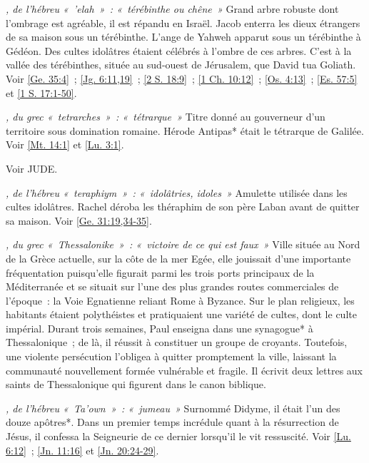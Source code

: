 \begin{multicols}{2}
\textit{, de l'hébreu «~'elah~»~: «~térébinthe ou chêne~»}\newline
Grand arbre robuste dont l'ombrage est agréable, il est répandu en Israël. Jacob enterra les dieux étrangers de sa maison sous un térébinthe. L'ange de Yahweh apparut sous un térébinthe à Gédéon. Des cultes idolâtres étaient célébrés à l'ombre de ces arbres. C'est à la vallée des térébinthes, située au sud-ouest de Jérusalem, que David tua Goliath. Voir \vref{Ge. 35:4}~; \vref{Jg. 6:11,19}~; \vref{2 S. 18:9}~; \vref{1 Ch. 10:12}~; \vref{Os. 4:13}~; \vref{Es. 57:5} et \vref{1 S. 17:1-50}.

\textit{, du grec «~tetrarches~»~: «~tétrarque~»}\newline
Titre donné au gouverneur d'un territoire sous domination romaine. Hérode Antipas* était le tétrarque de Galilée. Voir \vref{Mt. 14:1} et \vref{Lu. 3:1}.

\textit{}\newline
Voir JUDE.

\textit{, de l'hébreu «~teraphiym~»~: «~idolâtries, idoles~»}\newline
Amulette utilisée dans les cultes idolâtres. Rachel déroba les théraphim de son père Laban avant de quitter sa maison. Voir \vref{Ge. 31:19,34-35}.

\textit{, du grec «~Thessalonike~»~: «~victoire de ce qui est faux~»}\newline
Ville située au Nord de la Grèce actuelle, sur la côte de la mer Egée, elle jouissait d'une importante fréquentation puisqu'elle figurait parmi les trois ports principaux de la Méditerranée et se situait sur l'une des plus grandes routes commerciales de l'époque~: la Voie Egnatienne reliant Rome à Byzance. Sur le plan religieux, les habitants étaient polythéistes et pratiquaient une variété de cultes, dont le culte impérial. Durant trois semaines, Paul enseigna dans une synagogue* à Thessalonique~; de là, il réussit à constituer un groupe de croyants. Toutefois, une violente persécution l'obligea à quitter promptement la ville, laissant la communauté nouvellement formée vulnérable et fragile. Il écrivit deux lettres aux saints de Thessalonique qui figurent dans le canon biblique.

\textit{, de l'hébreu «~Ta'own~»~: «~jumeau~»}\newline
Surnommé Didyme, il était l'un des douze apôtres*. Dans un premier temps incrédule quant à la résurrection de Jésus, il confessa la Seigneurie de ce dernier lorsqu'il le vit ressuscité. Voir \vref{Lu. 6:12}~; \vref{Jn. 11:16} et \vref{Jn. 20:24-29}.


\end{multicols}
